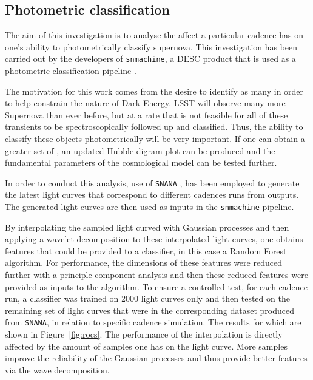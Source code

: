 \subsection{Photometric classification}


The aim of this investigation is to analyse the affect a particular cadence has
on one's ability to photometrically classify supernova. This investigation has been carried out by the
developers of {\tt snmachine}, a DESC product that is used as a photometric
classification pipeline \cite{lochner2016photometric}.

The motivation for this work comes from the desire to identify as many \sne in
order to help constrain the nature of Dark Energy.
LSST will observe many more Supernova than ever before, but at a rate that is
not feasible for all of these transients to be spectroscopically followed up and
classified. Thus, the ability to classify these objects photometrically will be very
important. If one can obtain a greater set of \sne, an updated Hubble
digram plot can be produced and the fundamental parameters of the cosmological
model can be tested further.

In order to conduct this analysis, use of
{\tt SNANA} \cite{kessler2009snana}, has been employed to generate the latest light curves that
correspond to different cadences runs from \opsim outputs. The generated light
curves are then used as inputs in the {\tt snmachine} pipeline.

By interpolating the sampled light curved with Gaussian processes and then
applying a wavelet decomposition to these interpolated light curves, one obtains features
that could be provided to a classifier, in this case a Random Forest algorithm.
For performance, the dimensions of these features were reduced further with a principle
component analysis and then these reduced features were provided as inputs to the algorithm.
To ensure a controlled test,
for each cadence run, a classifier was trained on 2000 light
curves only and then tested on the remaining set of light curves that were in the
corresponding dataset produced from {\tt SNANA}, in relation to specific
\opsim cadence simulation. The results for which are shown in
Figure~\ref{fig:rocs}.
The performance of the interpolation is directly affected by the amount of
samples one has on the light curve. More samples improve the reliability of the
Gaussian processes and thus provide better features via the wave
decomposition.

